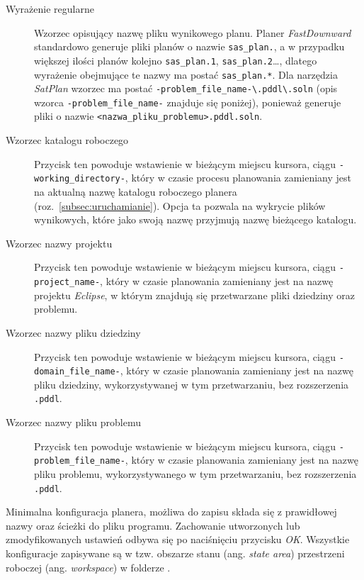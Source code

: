{
\setcounter{alphcount}{1}
\renewcommand{\descriptionlabel}[1]%
{\hspace\labelsep\normalfont\bfseries\alph{alphcount}) #1\stepcounter{alphcount}}
\begin{description}
\item [Wyrażenie regularne] Wzorzec opisujący nazwę pliku wynikowego planu. Planer \emph{FastDownward} standardowo generuje pliki planów o nazwie \texttt{sas\_plan.}, a w przypadku większej ilości planów kolejno \texttt{sas\_plan.1}, \texttt{sas\_plan.2}\ldots, dlatego wyrażenie obejmujące te nazwy ma postać \texttt{sas\_plan.*}. Dla narzędzia \emph{SatPlan} wzorzec ma postać \texttt{-problem\_file\_name-\textbackslash.pddl\textbackslash.soln} (opis wzorca \texttt{-problem\_file\_name-} znajduje się poniżej), ponieważ generuje pliki o nazwie \texttt{<nazwa\_pliku\_problemu>.pddl.soln}.
\item [Wzorzec katalogu roboczego] Przycisk ten powoduje wstawienie w bieżącym miejscu kursora, ciągu \texttt{-working\_directory-}, który w czasie procesu planowania zamieniany jest na aktualną nazwę katalogu roboczego planera (roz.~\ref{subsec:uruchamianie}). Opcja ta pozwala na wykrycie plików wynikowych, które jako swoją nazwę przyjmują nazwę bieżącego katalogu.
\item [Wzorzec nazwy projektu] Przycisk ten powoduje wstawienie w bieżącym miejscu kursora, ciągu \texttt{-project\_name-}, który w czasie planowania zamieniany jest na nazwę projektu \emph{Eclipse}, w którym znajdują się przetwarzane pliki dziedziny oraz problemu.
\item [Wzorzec nazwy pliku dziedziny] Przycisk ten powoduje wstawienie w bieżącym miejscu kursora, ciągu \texttt{-domain\_file\_name-}, który w czasie planowania zamieniany jest na nazwę pliku dziedziny, wykorzystywanej w tym przetwarzaniu, bez rozszerzenia \texttt{.pddl}.
\item [Wzorzec nazwy pliku problemu] Przycisk ten powoduje wstawienie w bieżącym miejscu kursora, ciągu \texttt{-problem\_file\_name-}, który w czasie planowania zamieniany jest na nazwę pliku problemu, wykorzystywanego w tym przetwarzaniu, bez rozszerzenia \texttt{.pddl}.
\end{description}
}


Minimalna konfiguracja planera, możliwa do zapisu składa się z prawidłowej nazwy oraz ścieżki do pliku programu. Zachowanie utworzonych lub zmodyfikowanych ustawień odbywa się po naciśnięciu przycisku \emph{OK}.
Wszystkie konfiguracje zapisywane są w tzw. obszarze stanu (ang. \textit{state area}) przestrzeni roboczej (ang. \textit{workspace}) w folderze . 

